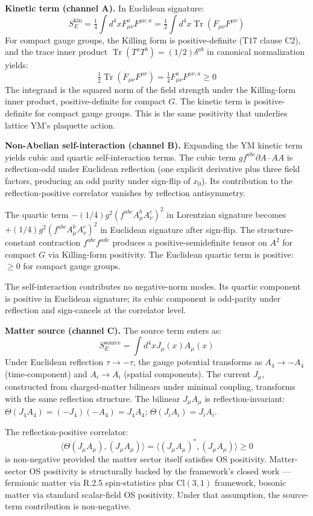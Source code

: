 \documentclass[11pt,a4paper]{article}
\begin{document}
\textbf{Kinetic term (channel A).} In Euclidean signature:
\[
S_E^\mathrm{kin} = \tfrac{1}{4} \int d^{4}x F_{\mu\nu}^a F^{\mu\nu,a} = \tfrac{1}{2} \int d^{4}x \operatorname{Tr}(F_{\mu\nu} F^{\mu\nu})
\]
For compact gauge groups, the Killing form is positive-definite (T17 clause C2), and the trace inner product $\operatorname{Tr}(T^a T^b) = (1/2)\delta^{ab}$ in canonical normalization yields:
\[
\tfrac{1}{2} \operatorname{Tr}(F_{\mu\nu} F^{\mu\nu}) = \tfrac{1}{4} F_{\mu\nu}^a F^{\mu\nu,a} \geq 0
\]
The integrand is the squared norm of the field strength under the Killing-form inner product, positive-definite for compact $G$. The kinetic term is positive-definite for compact gauge groups. This is the same positivity that underlies lattice YM's plaquette action.

\textbf{Non-Abelian self-interaction (channel B).} Expanding the YM kinetic term yields cubic and quartic self-interaction terms. The cubic term $g f^{abc} \partial A \cdot A A$ is reflection-odd under Euclidean reflection (one explicit derivative plus three field factors, producing an odd parity under sign-flip of $x_0$). Its contribution to the reflection-positive correlator vanishes by reflection antisymmetry.

The quartic term $-(1/4) g^{2} (f^{abc} A_\mu^b A_\nu^c)^{2}$ in Lorentzian signature becomes $+(1/4) g^{2} (f^{abc} A_\mu^b A_\nu^c)^{2}$ in Euclidean signature after sign-flip. The structure-constant contraction $f^{abc} f^{ade}$ produces a positive-semidefinite tensor on $A^{2}$ for compact $G$ via Killing-form positivity. The Euclidean quartic term is positive: $\geq 0$ for compact gauge groups.

The self-interaction contributes no negative-norm modes. Its quartic component is positive in Euclidean signature; its cubic component is odd-parity under reflection and sign-cancels at the correlator level.

\textbf{Matter source (channel C).} The source term enters as:
\[
S_E^\mathrm{source} = \int d^{4}x J_\mu(x) A_\mu(x)
\]
Under Euclidean reflection $\tau \to -\tau$, the gauge potential transforms as $A_4 \to -A_4$ (time-component) and $A_i \to A_i$ (spatial components). The current $J_\mu$, constructed from charged-matter bilinears under minimal coupling, transforms with the same reflection structure. The bilinear $J_\mu A_\mu$ is reflection-invariant: $\Theta(J_4 A_4) = (-J_4)(-A_4) = J_4 A_4$; $\Theta(J_i A_i) = J_i A_i$.

The reflection-positive correlator:
\[
\langle \Theta(J_\mu A_\mu), (J_\mu A_\mu)\rangle = \langle (J_\mu A_\mu)^*, (J_\mu A_\mu)\rangle \geq 0
\]
is non-negative provided the matter sector itself satisfies OS positivity. Matter-sector OS positivity is structurally backed by the framework's closed work --- fermionic matter via R.2.5 spin-statistics plus $\mathrm{Cl}(3,1)$ framework, bosonic matter via standard scalar-field OS positivity. Under that assumption, the source-term contribution is non-negative.
\end{document}
